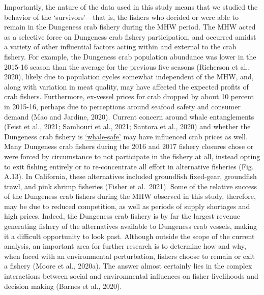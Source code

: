 \documentclass[]{elsarticle} %
\begin{document}
Importantly, the nature of the data used in this study means that we
studied the behavior of the `survivors'---that is, the fishers who
decided or were able to remain in the Dungeness crab fishery during the
MHW period. The MHW acted as a selective force on Dungeness crab fishery
participation, and occurred amidst a variety of other influential
factors acting within and external to the crab fishery. For example, the
Dungeness crab population abundance was lower in the 2015-16 season than
the average for the previous five seasons (Richerson et al., 2020),
likely due to population cycles somewhat independent of the MHW, and,
along with variation in meat quality, may have affected the expected
profits of crab fishers. Furthermore, ex-vessel prices for crab dropped
by about 10 percent in 2015-16, perhaps due to perceptions around
seafood safety and consumer demand (Mao and Jardine, 2020). Current
concern around whale entanglements (Feist et al., 2021; Samhouri et al.,
2021; Santora et al., 2020) and whether the Dungeness crab fishery is
\href{https://wildlife.ca.gov/Conservation/Marine/Whale-Safe-Fisheries}{`whale-safe'}
may have influenced crab prices as well. Many Dungeness crab fishers
during the 2016 and 2017 fishery closures chose or were forced by
circumstance to not participate in the fishery at all, instead opting to
exit fishing entirely or to re-concentrate all effort in alternative
fisheries (Fig. A.13). In California, these alternatives included
groundfish fixed-gear, groundfish trawl, and pink shrimp fisheries
(Fisher et al.~2021). Some of the relative success of the Dungeness crab
fishers during the MHW observed in this study, therefore, may be due to
reduced competition, as well as periods of supply shortages and high
prices. Indeed, the Dungeness crab fishery is by far the largest revenue
generating fishery of the alternatives available to Dungeness crab
vessels, making it a difficult opportunity to look past. Although
outside the scope of the current analysis, an important area for further
research is to determine how and why, when faced with an environmental
perturbation, fishers choose to remain or exit a fishery (Moore et al.,
2020a). The answer almost certainly lies in the complex interactions
between social and environmental influences on fisher livelihoods and
decision making (Barnes et al., 2020).
\end{document}
